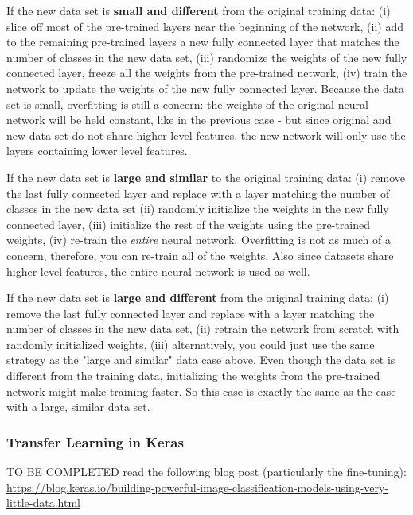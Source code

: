 \documentclass[11pt]{article}
\begin{document}
If the new data set is \textbf{small and different} from the original training data: (i) slice off most of the pre-trained layers near the beginning of the network, (ii) add to the remaining pre-trained layers a new fully connected layer that matches the number of classes in the new data set, (iii) randomize the weights of the new fully connected layer, freeze all the weights from the pre-trained network, (iv) train the network to update the weights of the new fully connected layer. Because the data set is small, overfitting is still a concern: the weights of the original neural network will be held constant, like in the previous case - but since original and new data set do not share higher level features, the new network will only use the layers containing lower level features.

If the new data set is \textbf{large and similar} to the original training data: (i) remove the last fully connected layer and replace with a layer matching the number of classes in the new data set (ii) randomly initialize the weights in the new fully connected layer, (iii) initialize the rest of the weights using the pre-trained weights, (iv) re-train the \textit{entire} neural network. Overfitting is not as much of a concern, therefore, you can re-train all of the weights. Also since datasets share higher level features, the entire neural network is used as well.

If the new data set is \textbf{large and different} from the original training data: (i) remove the last fully connected layer and replace with a layer matching the number of classes in the new data set, (ii) retrain the network from scratch with randomly initialized weights, (iii) alternatively, you could just use the same strategy as the "large and similar" data case above. Even though the data set is different from the training data, initializing the weights from the pre-trained network might make training faster. So this case is exactly the same as the case with a large, similar data set.

\subsubsection*{Transfer Learning in Keras}
TO BE COMPLETED
read the following blog post (particularly the fine-tuning):  \url{https://blog.keras.io/building-powerful-image-classification-models-using-very-little-data.html}

\end{document}
